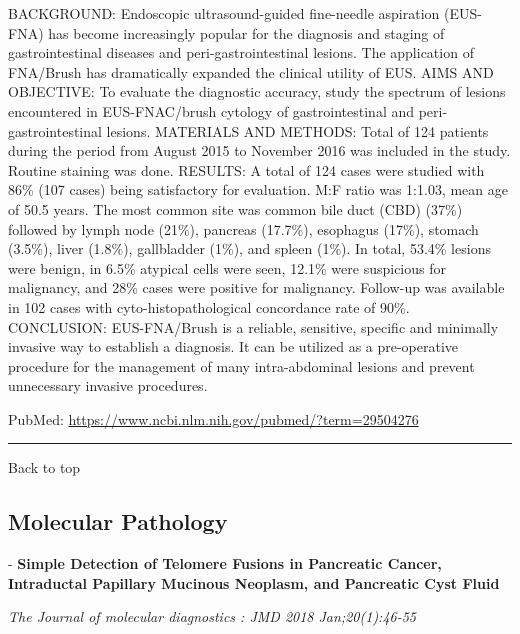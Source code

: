 \documentclass[]{article}
\begin{document}
BACKGROUND: Endoscopic ultrasound-guided fine-needle aspiration
(EUS-FNA) has become increasingly popular for the diagnosis and staging
of gastrointestinal diseases and peri-gastrointestinal lesions. The
application of FNA/Brush has dramatically expanded the clinical utility
of EUS. AIMS AND OBJECTIVE: To evaluate the diagnostic accuracy, study
the spectrum of lesions encountered in EUS-FNAC/brush cytology of
gastrointestinal and peri-gastrointestinal lesions. MATERIALS AND
METHODS: Total of 124 patients during the period from August 2015 to
November 2016 was included in the study. Routine staining was done.
RESULTS: A total of 124 cases were studied with 86\% (107 cases) being
satisfactory for evaluation. M:F ratio was 1:1.03, mean age of 50.5
years. The most common site was common bile duct (CBD) (37\%) followed
by lymph node (21\%), pancreas (17.7\%), esophagus (17\%), stomach
(3.5\%), liver (1.8\%), gallbladder (1\%), and spleen (1\%). In total,
53.4\% lesions were benign, in 6.5\% atypical cells were seen, 12.1\%
were suspicious for malignancy, and 28\% cases were positive for
malignancy. Follow-up was available in 102 cases with
cyto-histopathological concordance rate of 90\%. CONCLUSION:
EUS-FNA/Brush is a reliable, sensitive, specific and minimally invasive
way to establish a diagnosis. It can be utilized as a pre-operative
procedure for the management of many intra-abdominal lesions and prevent
unnecessary invasive procedures.

PubMed: \url{https://www.ncbi.nlm.nih.gov/pubmed/?term=29504276}

{}

{}

\begin{center}\rule{0.5\linewidth}{\linethickness}\end{center}

Back to top

\pagebreak

\hypertarget{molecular-pathology}{%
\subsection{Molecular Pathology}\label{molecular-pathology}}

 - \textbf{Simple Detection of Telomere Fusions in Pancreatic Cancer,
Intraductal Papillary Mucinous Neoplasm, and Pancreatic Cyst Fluid}

\emph{The Journal of molecular diagnostics : JMD 2018 Jan;20(1):46-55}
\end{document}
